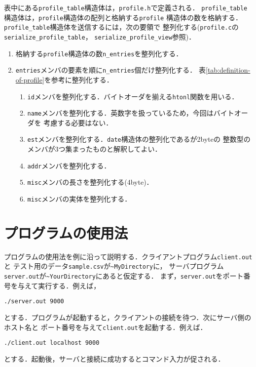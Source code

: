 \documentclass[a4j,10pt]{jarticle}
\begin{document}
表中にある\verb|profile_table|構造体は，\verb|profile.h|で定義される．
\verb|profile_table|構造体は，\verb|profile|構造体の配列と格納する\verb|profile|
構造体の数を格納する．\verb|profile_table|構造体を送信するには，次の要領で
整列化する(\verb|profile.c|の\verb|serialize_profile_table|，
\verb|serialize_profile_view|参照)．
\begin{enumerate}
\item 格納する\verb|profile|構造体の数\verb|n_entries|を整列化する．
\item \verb|entries|メンバの要素を順に\verb|n_entries|個だけ整列化する．
  表\ref{tab:definition-of-profile}を参考に整列化する．
  \begin{enumerate}
  \item \verb|id|メンバを整列化する．バイトオーダを揃える\verb|htonl|関数を用いる．
  \item \verb|name|メンバを整列化する．英数字を扱っているため，今回はバイトオーダを
    考慮する必要はない．
  \item \verb|est|メンバを整列化する．\verb|date|構造体の整列化であるが2byteの
    整数型のメンバが3つ集まったものと解釈してよい．
  \item \verb|addr|メンバを整列化する．
  \item \verb|misc|メンバの長さを整列化する(4byte)．
  \item \verb|misc|メンバの実体を整列化する．
  \end{enumerate}
\end{enumerate}

\section{プログラムの使用法}
\label{sec:usage}
プログラムの使用法を例に沿って説明する．クライアントプログラム\verb|client.out|と
テスト用のデータ\verb|sample.csv|が\verb|~MyDirectory|に，
サーバプログラム\verb|server.out|が\verb|~YourDirectory|にあると仮定する．
まず，\verb|server.out|をポート番号を与えて実行する．例えば，
\begin{verbatim}
./server.out 9000
\end{verbatim}
とする．プログラムが起動すると，クライアントの接続を待つ．次にサーバ側のホスト名と
ポート番号を与えて\verb|client.out|を起動する．例えば．
\begin{verbatim}
./client.out localhost 9000
\end{verbatim}
とする．起動後，サーバと接続に成功するとコマンド入力が促される．
\end{document}

